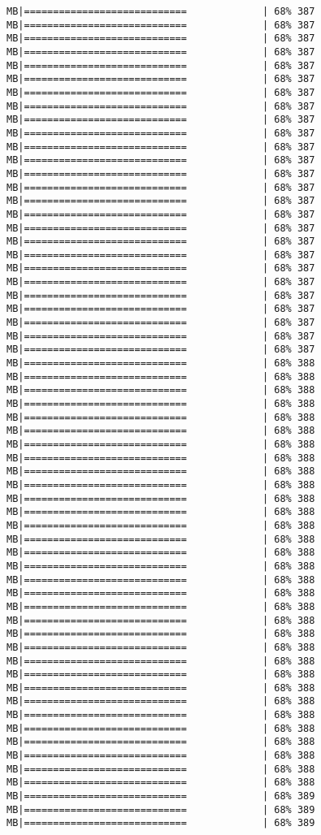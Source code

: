 \documentclass[
]{article}
\begin{document}
\begin{verbatim}
MB|============================             | 68% 387 MB|============================             | 68% 387 MB|============================             | 68% 387 MB|============================             | 68% 387 MB|============================             | 68% 387 MB|============================             | 68% 387 MB|============================             | 68% 387 MB|============================             | 68% 387 MB|============================             | 68% 387 MB|============================             | 68% 387 MB|============================             | 68% 387 MB|============================             | 68% 387 MB|============================             | 68% 387 MB|============================             | 68% 387 MB|============================             | 68% 387 MB|============================             | 68% 387 MB|============================             | 68% 387 MB|============================             | 68% 387 MB|============================             | 68% 387 MB|============================             | 68% 387 MB|============================             | 68% 387 MB|============================             | 68% 387 MB|============================             | 68% 387 MB|============================             | 68% 387 MB|============================             | 68% 387 MB|============================             | 68% 387 MB|============================             | 68% 388 MB|============================             | 68% 388 MB|============================             | 68% 388 MB|============================             | 68% 388 MB|============================             | 68% 388 MB|============================             | 68% 388 MB|============================             | 68% 388 MB|============================             | 68% 388 MB|============================             | 68% 388 MB|============================             | 68% 388 MB|============================             | 68% 388 MB|============================             | 68% 388 MB|============================             | 68% 388 MB|============================             | 68% 388 MB|============================             | 68% 388 MB|============================             | 68% 388 MB|============================             | 68% 388 MB|============================             | 68% 388 MB|============================             | 68% 388 MB|============================             | 68% 388 MB|============================             | 68% 388 MB|============================             | 68% 388 MB|============================             | 68% 388 MB|============================             | 68% 388 MB|============================             | 68% 388 MB|============================             | 68% 388 MB|============================             | 68% 388 MB|============================             | 68% 388 MB|============================             | 68% 388 MB|============================             | 68% 388 MB|============================             | 68% 388 MB|============================             | 68% 388 MB|============================             | 68% 389 MB|============================             | 68% 389 MB|============================             | 68% 389 
\end{verbatim}
\end{document}
